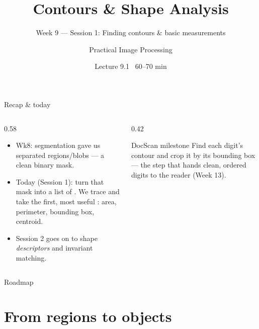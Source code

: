 \documentclass[10pt,aspectratio=169]{beamer}
\title{Contours \& Shape Analysis}
\subtitle{Week 9 — Session 1: Finding contours \& basic measurements}
\author{Practical Image Processing}
\date{Lecture 9.1 \textbullet\ 60--70 min}
\begin{document}
\maketitle

\begin{frame}{Recap \& today}
  \begin{columns}[T]
    \begin{column}{0.58\textwidth}
      \begin{itemize}
        \item Wk8: segmentation gave us separated regions/blobs — a clean binary mask.
        \item \alert{Today (Session 1):} turn that mask into a list of . We
              trace  and take the first, most useful :
              area, perimeter, bounding box, centroid.
        \item Session 2 goes on to shape \emph{descriptors} and invariant matching.
      \end{itemize}
    \end{column}
    \begin{column}{0.42\textwidth}
      \begin{alertblock}{DocScan milestone}
        Find each digit's contour and crop it by its bounding box — the step that hands clean,
        ordered digits to the reader (Week 13).
      \end{alertblock}
    \end{column}
  \end{columns}
\end{frame}

\begin{frame}{Roadmap}\tableofcontents\end{frame}

\section{From regions to objects}
\end{document}
